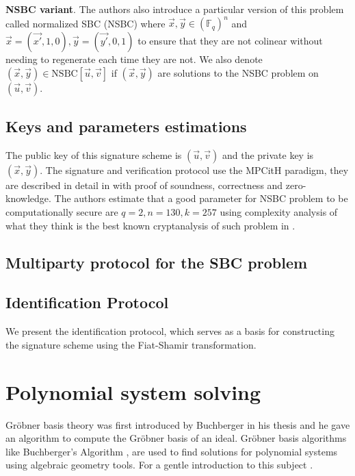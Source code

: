 \documentclass[english]{article}
\begin{document}
		\textbf{NSBC variant}.
		The authors also introduce a particular version of this problem called normalized SBC (NSBC) where $\vec{x}, \vec{y} \in (\mathbb{F}_q)^n$ and
		$\vec{x} = (\vec{x'}, 1, 0), \vec{y} = (\vec{y'}, 0, 1)$ to ensure that they are not colinear without needing to regenerate each time they are not. We also denote $(\vec{x}, \vec{y}) \in \text{NSBC}[\vec{u}, \vec{v}]$ if $(\vec{x}, \vec{y})$ are solutions to the NSBC problem on $(\vec{u}, \vec{v})$.
		
		\subsection{Keys and parameters estimations}
		The public key of this signature scheme is $(\vec{u},\vec{v})$ and the private key is $(\vec{x}, \vec{y})$.
		The signature and verification protocol use the MPCitH paradigm, they are described in detail in \cite{HJ23} with proof of soundness, correctness and zero-knowledge.
		The authors estimate that a good parameter for NSBC problem to be computationally secure are $q = 2, n = 130, k = 257$ using complexity analysis of what they think is the best known cryptanalysis of such problem in \cite{FSS11}.
		
		\subsection{Multiparty protocol for the SBC problem}
		
		
		
		\subsection{Identification Protocol}
		We present the identification protocol, which serves as a basis for constructing the signature scheme using the Fiat-Shamir transformation.
		
		
		
	\section{Polynomial system solving}
		Gröbner basis theory was first introduced by Buchberger in his thesis \cite{Buc} and he gave an algorithm to compute the Gröbner basis of an ideal.
		Gröbner basis algorithms like Buchberger's Algorithm \cite{Buc}, are used to find solutions for polynomial systems using algebraic geometry tools. For a gentle introduction to this subject \cite{CLS}.
		
\end{document}
